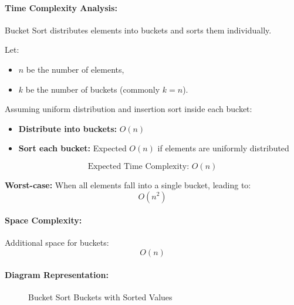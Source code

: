 \paragraph{Time Complexity Analysis:}
Bucket Sort distributes elements into buckets and sorts them individually.

Let:
\begin{itemize}
  \item \( n \) be the number of elements,
  \item \( k \) be the number of buckets (commonly \( k = n \)).
\end{itemize}

Assuming uniform distribution and insertion sort inside each bucket:

\begin{itemize}
  \item \textbf{Distribute into buckets:} \( O(n) \)
  \item \textbf{Sort each bucket:} Expected \( O(n) \) if elements are uniformly distributed
\end{itemize}

\[
\boxed{\text{Expected Time Complexity: } O(n)}
\]

\textbf{Worst-case:} When all elements fall into a single bucket, leading to:
\[
\boxed{O(n^2)}
\]

\paragraph{Space Complexity:}
Additional space for buckets:
\[
\boxed{O(n)}
\]

\paragraph{Diagram Representation:}

\begin{figure}[H]
\centering
{}
\caption{Bucket Sort Buckets with Sorted Values}
\end{figure}

